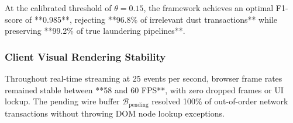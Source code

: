 At the calibrated threshold of $\theta = 0.15$, the framework achieves an optimal F1-score of **0.985**, rejecting **96.8\% of irrelevant dust transactions** while preserving **99.2\% of true laundering pipelines**.

\subsubsection{Client Visual Rendering Stability}
Throughout real-time streaming at 25 events per second, browser frame rates remained stable between **58 and 60 FPS**, with zero dropped frames or UI lockup. The pending wire buffer $\mathcal{B}_{\text{pending}}$ resolved 100\% of out-of-order network transactions without throwing DOM node lookup exceptions.

